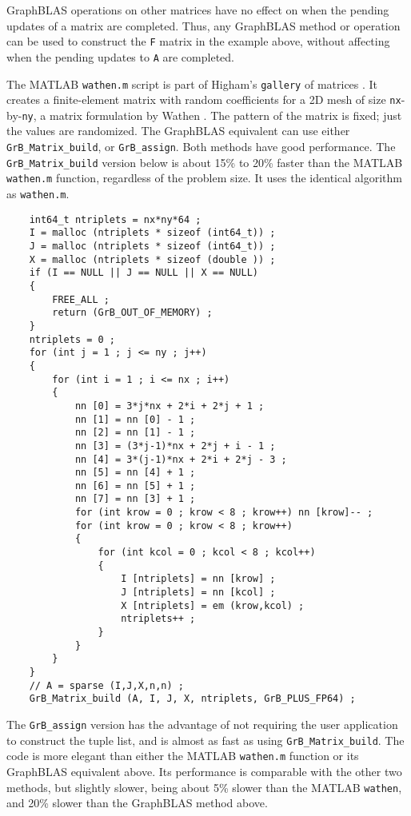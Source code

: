 \documentclass[12pt]{article}
\begin{document}
GraphBLAS operations on other matrices have no effect on when the pending
updates of a matrix are completed.  Thus, any GraphBLAS method or operation can
be used to construct the \verb'F' matrix in the example above, without
affecting when the pending updates to \verb'A' are completed.

The MATLAB \verb'wathen.m' script is part of Higham's \verb'gallery' of
matrices \cite{Higham}.  It creates a finite-element matrix with random
coefficients for a 2D mesh of size \verb'nx'-by-\verb'ny', a matrix formulation
by Wathen \cite{Wathen}.  The pattern of the matrix is fixed; just the values
are randomized.  The GraphBLAS equivalent can use either
\verb'GrB_Matrix_build', or \verb'GrB_assign'.  Both methods have good
performance.  The \verb'GrB_Matrix_build' version below is about 15\% to 20\%
faster than the MATLAB \verb'wathen.m' function, regardless of the problem
size.  It uses the identical algorithm as \verb'wathen.m'.

    {\footnotesize
    \begin{verbatim}
    int64_t ntriplets = nx*ny*64 ;
    I = malloc (ntriplets * sizeof (int64_t)) ;
    J = malloc (ntriplets * sizeof (int64_t)) ;
    X = malloc (ntriplets * sizeof (double )) ;
    if (I == NULL || J == NULL || X == NULL)
    {
        FREE_ALL ;
        return (GrB_OUT_OF_MEMORY) ;
    }
    ntriplets = 0 ;
    for (int j = 1 ; j <= ny ; j++)
    {
        for (int i = 1 ; i <= nx ; i++)
        {
            nn [0] = 3*j*nx + 2*i + 2*j + 1 ;
            nn [1] = nn [0] - 1 ;
            nn [2] = nn [1] - 1 ;
            nn [3] = (3*j-1)*nx + 2*j + i - 1 ;
            nn [4] = 3*(j-1)*nx + 2*i + 2*j - 3 ;
            nn [5] = nn [4] + 1 ;
            nn [6] = nn [5] + 1 ;
            nn [7] = nn [3] + 1 ;
            for (int krow = 0 ; krow < 8 ; krow++) nn [krow]-- ;
            for (int krow = 0 ; krow < 8 ; krow++)
            {
                for (int kcol = 0 ; kcol < 8 ; kcol++)
                {
                    I [ntriplets] = nn [krow] ;
                    J [ntriplets] = nn [kcol] ;
                    X [ntriplets] = em (krow,kcol) ;
                    ntriplets++ ;
                }
            }
        }
    }
    // A = sparse (I,J,X,n,n) ;
    GrB_Matrix_build (A, I, J, X, ntriplets, GrB_PLUS_FP64) ; \end{verbatim}}

The \verb'GrB_assign' version has the advantage of not requiring the
user application to construct the tuple list, and is almost as fast as using
\verb'GrB_Matrix_build'.  The code is more elegant than either the MATLAB
\verb'wathen.m' function or its GraphBLAS equivalent above.  Its performance is
comparable with the other two methods, but slightly slower, being about 5\%
slower than the MATLAB \verb'wathen', and 20\% slower than the GraphBLAS
method above.
\end{document}
